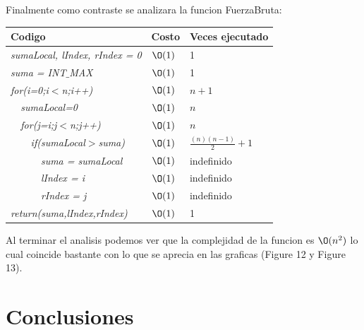\documentclass[spanish]{article}
\begin{document}
	Finalmente como contraste se analizara la funcion FuerzaBruta:
	\begin{center}
		\begin{table}[H]
			\begin{tabular}{|l|l|l|}
				\hline
				\rowcolor[HTML]{FFCC67} 
				Codigo                           & Costo & Veces ejecutado \\ \hline
				\textit{sumaLocal, lIndex, rIndex = 0}                    & $\O(1)$    & 1               \\ \hline
				\textit{suma = INT$\_$MAX}                    & $\O(1)$    & 1               \\ \hline				

				\textit{for(i=0;i$<$n;i++)} & $\O(1)$    & $n+1$             \\ \hline
				\textit{\  \  sumaLocal=0}                 & $\O(1)$    & $n$               \\ \hline
				\textit{\  \  for(j=i;j$<$n;j++)}                 & $\O(1)$    & $n$               \\ \hline
				\textit{\  \  \  \  if(sumaLocal$>$suma)}                     & $\O(1)$    & $\frac{(n)(n-1)}{2}+1$              \\ \hline
				\textit{\  \  \  \  \  \  suma = sumaLocal}                     & $\O(1)$    & indefinido              \\ \hline				
				\textit{\  \  \  \  \  \  lIndex = i}                     & $\O(1)$    & indefinido              \\ \hline				
				\textit{\  \  \  \  \  \  rIndex = j}                     & $\O(1)$    & indefinido              \\ \hline								
				\textit{return(suma,lIndex,rIndex)}                     & $\O(1)$    & 1              \\ \hline			
			\end{tabular}
		\end{table}										
	\end{center}
	Al terminar el analisis podemos ver que la complejidad de la funcion es $\O(n^2)$ lo cual coincide bastante con lo que se aprecia en las graficas (Figure 12 y Figure 13).

	
	\section{Conclusiones}			
\end{document}
